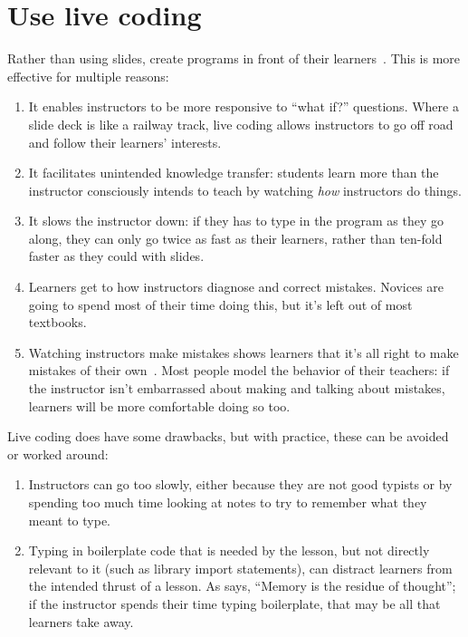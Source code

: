 \documentclass{article}
\begin{document}
\section{Use live coding}\label{live-coding}

Rather than using slides,
create programs in front of their learners~\cite{rubin-live-coding}.
This is more effective for multiple reasons:

\begin{enumerate}

\item It enables instructors to be more responsive to ``what if?''
  questions. Where a slide deck is like a railway track, live coding
  allows instructors to go off road and follow their learners'
  interests.

\item It facilitates unintended knowledge transfer: students learn more
  than the instructor consciously intends to teach by watching \textit{how}
  instructors do things.

\item It slows the instructor down: if they has to type in the program
  as they go along, they can only go twice as fast as their
  learners, rather than ten-fold faster as they could with slides.

\item Learners get to how instructors diagnose and correct
  mistakes. Novices are going to spend most of their time doing
  this, but it's left out of most textbooks.

\item Watching instructors make mistakes shows learners that it's all
  right to make mistakes of their own~\citep{barker-live-coding}.
  Most people model the behavior of their teachers: if the instructor
  isn't embarrassed about making and talking about mistakes, learners
  will be more comfortable doing so too.

\end{enumerate}

Live coding does have some drawbacks, but with practice, these can be
avoided or worked around:

\begin{enumerate}

\item Instructors can go too slowly, either because they are not good
  typists or by spending too much time looking at notes to try to
  remember what they meant to type.

\item Typing in boilerplate code that is needed by the lesson, but not
  directly relevant to it (such as library import statements), can
  distract learners from the intended thrust of a lesson.  As
  \citet{willingham-book} says, ``Memory is the residue of thought'';
  if the instructor spends their time typing boilerplate, that may be
  all that learners take away.

\end{enumerate}
\end{document}
